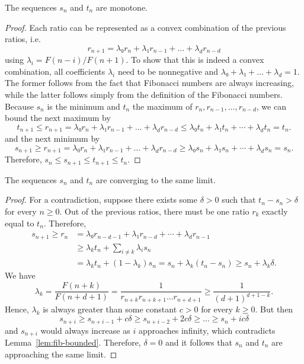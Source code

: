 \begin{lemma}
  The sequences $s_n$ and $t_n$ are monotone.
\end{lemma}

\begin{proof}
  Each ratio can be represented as a convex combination of the previous ratios, i.e.
  \[
    r_{n+1} = λ₀ r_n + λ₁ r_{n-1} + \dots + λ_d r_{n-d}
  \]
  using $λ_i = F(n - i) / F(n + 1)$.
  To show that this is indeed a convex combination, all coefficients $λ_i$
  need to be nonnegative and $λ₀ + λ₁ + \dots + \lambda_d = 1$.
  The former follows from the fact that Fibonacci numbers are always increasing,
  while the latter follows simply from the definition of the Fibonacci numbers.
  Because $s_n$ is the minimum and $t_n$ the maximum of $r_n, r_{n-1}, …, r_{n-d}$,
  we can bound the next maximum by
  \[
    t_{n+1} ≤ r_{n+1} = λ₀ r_n + λ₁ r_{n-1} + \dots + λ_d r_{n-d} ≤ λ₀ t_n + λ₁ t_n + ⋯ + λ_d t_n = t_n.
  \]
  and the next minimum by
  \[
    s_{n+1} ≥ r_{n+1} = λ₀ r_n + λ₁ r_{n-1} + \dots + λ_d r_{n-d} ≥ λ₀ s_n + λ₁ s_n + ⋯ + λ_d s_n = s_n.
  \]
  Therefore, $s_n ≤ s_{n+1} ≤ t_{n+1} ≤ t_n$.
\end{proof}

\begin{lemma}
  The sequences $s_n$ and $t_n$ are converging to the same limit.
\end{lemma}

\begin{proof}
  For a contradiction, suppose there exists some $δ > 0$ such that $t_n - s_n > δ$ for every $n ≥ 0$.
  Out of the previous ratios, there must be one ratio $r_k$ exactly equal to $t_n$.
  Therefore,
  \begin{align*}
    s_{n+1} ≥ r_n & = λ₀ r_{n-d-1} + λ₁ r_{n-d} + ⋯ + λ_d r_{n-1} \\
                  & ≥ λ_k t_n + \sum_{i ≠ k} λ_i s_n \\
                  & = λ_k t_n + (1 - λ_k) s_n = s_n + λ_k (t_n - s_n) ≥ s_n + λ_k δ.
  \end{align*}
  We have
  \[
    λ_k = \frac{F(n+k)}{F(n+d+1)} = \frac{1}{r_{n+k} r_{n+k+1} \dots r_{n+d+1}} ≥ \frac{1}{(d+1)^{d+1-k}}.
  \]
  Hence, $λ_k$ is always greater than some constant $c > 0$ for every $k ≥ 0$.
  But then
  \[
    s_{n+i} ≥ s_{n+i-1} + c δ ≥ s_{n+i-2} + 2c δ ≥ \dots ≥ s_n + i c δ
  \]
  and $s_{n+i}$ would always increase as $i$ approaches infinity,
  which contradicts Lemma~\ref{lem:fib-bounded}.
  Therefore, $δ = 0$ and it follows that $s_n$ and $t_n$ are approaching the same limit.
\end{proof}


